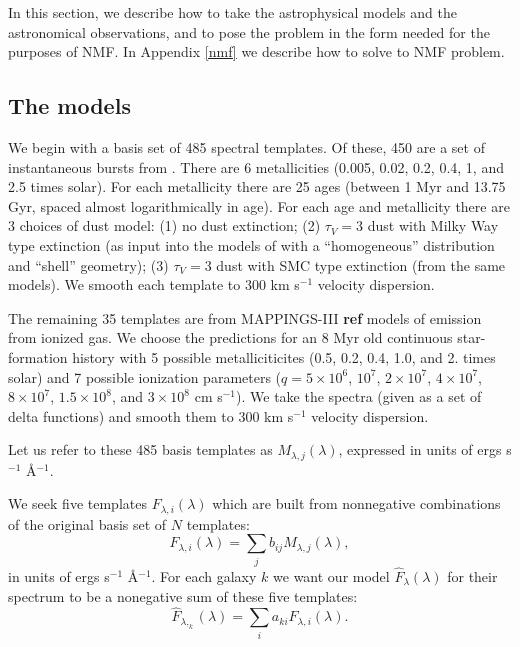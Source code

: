 \documentclass[10pt,preprint]{aastex}
\begin{document}
In this section, we describe how to take the astrophysical
models and the astronomical observations, and to pose the problem in
the form needed for the purposes of NMF. In Appendix \ref{nmf} we describe
how to solve to NMF problem.

\subsection{The models}
\label{models}

We begin with a basis set of 485 spectral templates. Of these, 450 are
a set of instantaneous bursts from \citet{bruzual03a}. There are 6
metallicities (0.005, 0.02, 0.2, 0.4, 1, and 2.5 times solar). For
each metallicity there are 25 ages (between 1 Myr and 13.75 Gyr,
spaced almost logarithmically in age).  For each age and metallicity
there are 3 choices of dust model: (1) no dust extinction; (2) $\tau_V
= 3$ dust with Milky Way type extinction (as input into the models of
\citealt{witt00a} with a ``homogeneous'' distribution and ``shell''
geometry); (3) $\tau_V = 3$ dust with SMC type extinction (from the
same models). We smooth each template to $300$ km s$^{-1}$ velocity
dispersion. 

The remaining 35 templates are from MAPPINGS-III {\bf ref} models of
emission from ionized gas. We choose the predictions for an 8 Myr old
continuous star-formation history with 5 possible metalliciticites
(0.5, 0.2, 0.4, 1.0, and 2. times solar) and 7 possible ionization
parameters ($q= 5\times 10^6$, $10^7$, $2\times 10^7$, $4\times 10^7$,
$8 \times 10^7$, $1.5\times 10^8$, and $3\times 10^8$ cm s$^{-1}$). We
take the spectra (given as a set of delta functions) and smooth them
to $300$ km s$^{-1}$ velocity dispersion.

Let us refer to these 485 basis templates as $M_{\lambda,
j}(\lambda)$, expressed in units of ergs s$^{-1}$ \AA$^{-1}$.

We seek five templates $F_{\lambda, i}(\lambda)$ which are built from
nonnegative combinations of the original basis set of $N$ templates:
\begin{equation}
F_{\lambda, i}(\lambda) = \sum_j b_{ij} M_{\lambda, j}(\lambda),
\end{equation}
in units of ergs s$^{-1}$ \AA$^{-1}$.  For each galaxy $k$
we want our model ${\hat{F}_\lambda}(\lambda)$ for their spectrum to
be a nonegative sum of these five templates:
\begin{equation}
{\hat{F}}_{\lambda,_k}(\lambda) = \sum_i a_{ki} F_{\lambda,i}(\lambda).
\end{equation}
\end{document}
